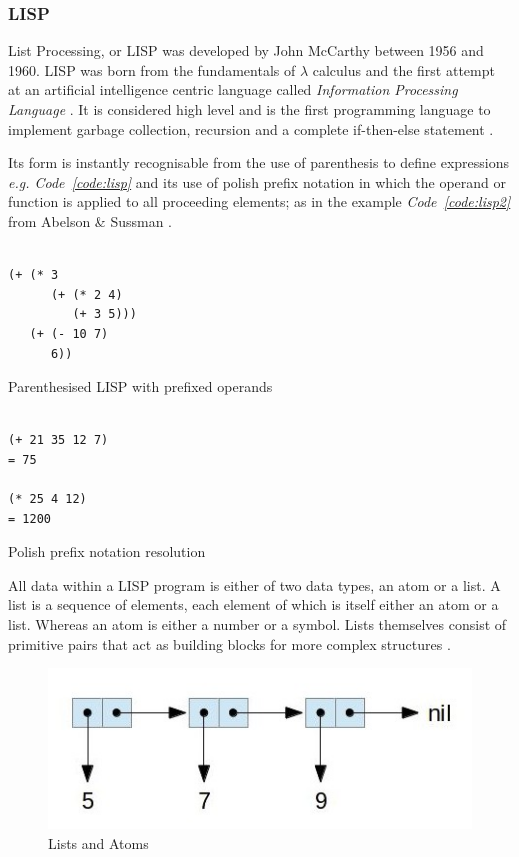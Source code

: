 \documentclass[12pt,a4paper]{article}
\begin{document}
\subsubsection{LISP}

List Processing, or LISP was developed by John McCarthy between 1956 and 1960. LISP was born from the fundamentals of $\lambda$ calculus and the first attempt at an artificial intelligence centric language called \emph{Information Processing Language} \cite{lispPart1,historyOfLisp}. It is considered high level and is the first programming language to implement garbage collection, recursion and a complete if-then-else statement \cite{lispPart1,historyOfLisp,beatingTheAverages}.

Its form is instantly recognisable from the use of parenthesis to define expressions \textit{e.g. Code~\ref{code:lisp}} and its use of polish prefix notation \cite{historyOfLisp} in which the operand or function is applied to all proceeding elements; as in the example \textit{Code~\ref{code:lisp2}} from Abelson \& Sussman \cite{structureAndInterpretation}.
\begin{code}
  \begin{verbatim}

(+ (* 3
      (+ (* 2 4)
         (+ 3 5)))
   (+ (- 10 7)
      6))
  \end{verbatim}
  \caption{Parenthesised LISP with prefixed operands}
  \label{code:lisp}
\end{code}

\begin{code}
  \begin{verbatim}

(+ 21 35 12 7)
= 75

(* 25 4 12)
= 1200
  \end{verbatim}
  \caption{Polish prefix notation resolution}
  \label{code:lisp2}
\end{code}

All data within a LISP program is either of two data types, an atom or a list. A list is a sequence of elements, each element of which is itself either an atom or a list. Whereas an atom is either a number or a symbol. Lists themselves consist of primitive pairs that act as building blocks for more complex structures \cite{lispPart1,structureAndInterpretation}.

\begin{figure}[h]
  \centering
  \includegraphics[scale=.5]{list}
  \caption{Lists and Atoms}
  \label{fig:listsAndAtoms}
\end{figure}
\end{document}
